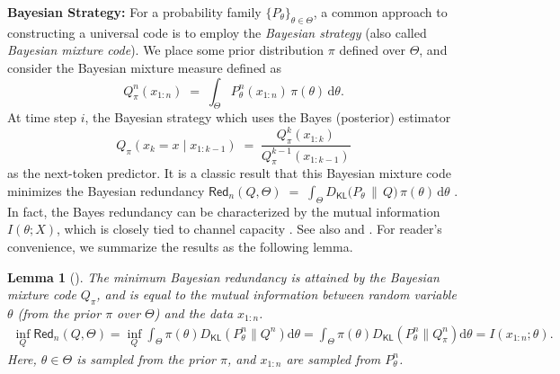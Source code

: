 \documentclass[11pt]{article}
\theoremstyle{plain}
\newtheorem{lemma}[theorem]{Lemma}
\theoremstyle{definition}
\newcommand{\dd}{\mathrm{d}}
\newcommand{\DKL}{D_{\mathsf{KL}}}
\newcommand{\redundency}{\mathsf{Red}}
\begin{document}
\noindent
{\bf Bayesian Strategy:}
For a probability family \(\{P_\theta\}_{\theta \in \Theta}\), 
a common approach to constructing a universal code is to employ the \emph{Bayesian strategy} (also called {\em Bayesian mixture code}).
We place some prior distribution \(\pi\) defined over \(\Theta\),
and consider the  Bayesian mixture measure defined as 
$$
Q^n_{\pi}(x_{1:n}) \;=\; \int_\Theta P^n_\theta(x_{1:n})\,\pi(\theta)\,\dd\theta.
$$
At time step $i$, the Bayesian strategy
which uses the Bayes (posterior) estimator 
$$
Q_{\pi}(x_k = x \mid x_{1:k-1}) \;=\; \frac{Q^{k}_{\pi}(x_{1:k})}
{Q^{k-1}_{\pi}(x_{1:k-1})}
$$
as the next-token predictor. 
It is a classic result that this Bayesian mixture code minimizes the Bayesian redundancy 
$
\redundency_n(Q, \Theta) \;=\; \int_\Theta \DKL\bigl(P_\theta \,\big\|\, Q\bigr)\,\pi(\theta)\,\dd\theta
$
\citep{aitchison1975goodness}. In fact, the Bayes redundancy can be characterized by the mutual information \(I(\theta; X)\), which is closely tied to channel capacity \citep{gallager1979source,clarke1994jeffreys,cover2006elements}. 
See also \citep[Ch. 19]{duchi2024lecture} and 
\cite{jeoninformation}. For reader's convenience, we summarize
the results as the following lemma.

\begin{lemma}[\citep{clarke1994jeffreys,duchi2024lecture,jeon2024information}]
\label{lem:baye red}
The minimum Bayesian redundancy is attained by the Bayesian mixture code $Q_{\pi}$, and is equal to the mutual information between random variable $\theta$ (from the prior $\pi$ over $\Theta$) and the data $x_{1:n}$.
\begin{align*}
\inf_Q\redundency_n(Q, \Theta)=
\inf_Q\int_\Theta \pi(\theta) \DKL(P^n_\theta\| Q^n) \dd \theta
=\int_\Theta \pi(\theta) \DKL(P^n_\theta\| Q_{\pi}^n) \dd \theta
= I(x_{1:n}; \theta).
\end{align*}
Here, $\theta\in \Theta$ is sampled from the prior $\pi$,
and $x_{1:n}$ are sampled from $P^n_{\theta}$.
\end{lemma}
\end{document}

